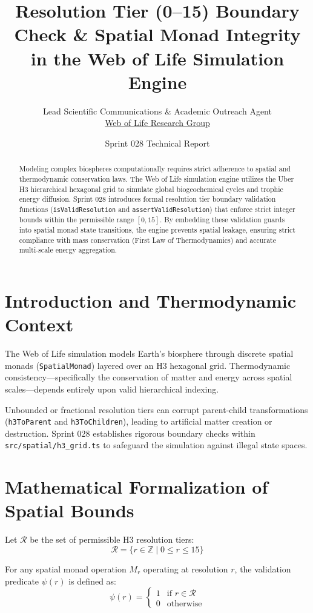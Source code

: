 \documentclass[11pt, a4paper]{article}
\title{\textbf{Resolution Tier (0--15) Boundary Check \& Spatial Monad Integrity in the Web of Life Simulation Engine}}
\author{Lead Scientific Communications \& Academic Outreach Agent \\ \href{https://github.com/pascalranoroarijaona/WebOfLife}{Web of Life Research Group}}
\date{Sprint 028 Technical Report}
\begin{document}
\maketitle

\begin{abstract}
Modeling complex biospheres computationally requires strict adherence to spatial and thermodynamic conservation laws. The Web of Life simulation engine utilizes the Uber H3 hierarchical hexagonal grid to simulate global biogeochemical cycles and trophic energy diffusion. Sprint 028 introduces formal resolution tier boundary validation functions (\texttt{isValidResolution} and \texttt{assertValidResolution}) that enforce strict integer bounds within the permissible range $[0, 15]$. By embedding these validation guards into spatial monad state transitions, the engine prevents spatial leakage, ensuring strict compliance with mass conservation (First Law of Thermodynamics) and accurate multi-scale energy aggregation.
\end{abstract}

\section{Introduction and Thermodynamic Context}
The Web of Life simulation models Earth's biosphere through discrete spatial monads (\texttt{SpatialMonad}) layered over an H3 hexagonal grid. Thermodynamic consistency—specifically the conservation of matter and energy across spatial scales—depends entirely upon valid hierarchical indexing. 

Unbounded or fractional resolution tiers can corrupt parent-child transformations (\texttt{h3ToParent} and \texttt{h3ToChildren}), leading to artificial matter creation or destruction. Sprint 028 establishes rigorous boundary checks within \texttt{src/spatial/h3\_grid.ts} to safeguard the simulation against illegal state spaces.

\section{Mathematical Formalization of Spatial Bounds}
Let $\mathcal{R}$ be the set of permissible H3 resolution tiers:
$$\mathcal{R} = \{ r \in \mathbb{Z} \mid 0 \le r \le 15 \}$$

For any spatial monad operation $M_r$ operating at resolution $r$, the validation predicate $\psi(r)$ is defined as:
$$\psi(r) = \begin{cases} 
1 & \text{if } r \in \mathcal{R} \\ 
0 & \text{otherwise} 
\end{cases}$$
\end{document}
